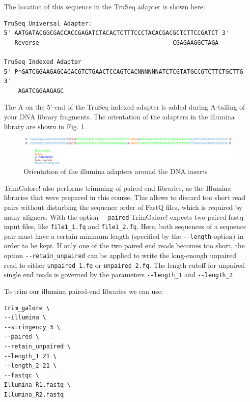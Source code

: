 \documentclass[11pt]{article}
\begin{document}
The location of this sequence in the TruSeq adapter is shown here:

\begin{verbatim}
TruSeq Universal Adapter:
5' AATGATACGGCGACCACCGAGATCTACACTCTTTCCCTACACGACGCTCTTCCGATCT 3'
   Reverse                                      CGAGAAGGCTAGA 

TruSeq Indexed Adapter
5' P*GATCGGAAGAGCACACGTCTGAACTCCAGTCACNNNNNNATCTCGTATGCCGTCTTCTGCTTG 3'
    AGATCGGAAGAGC
\end{verbatim}

The A on the 5'-end of the TruSeq indexed adapter is added during
A-tailing of your DNA library fragments.
The orientation of the adapters in the illumina library are shown in Fig. \ref{fig:illuminaadapters}.
\begin{figure}[htb]
\centering
\includegraphics[width=17cm]{IlluminaAdaptersVisualized.pdf}
\caption{\label{fig:illuminaadapters}Orientation of the illumina adapters around the DNA inserts}
\end{figure}


TrimGalore! also performs trimming of paired-end libraries, as the
Illumina libraries that were prepared in this course. This allows to
discard too short read pairs without disturbing the sequence order of
FastQ files, which is required by many aligners.  With the option
\texttt{-{}-paired} TrimGalore! expects two paired fastq input files, like
\texttt{file1\_1.fq} and \texttt{file1\_2.fq}.  Here, both sequences of a sequence
pair must have a certain minimum length (specified by the \texttt{-{}-length}
option) in order to be kept. If only one of the two paired end reads
becomes too short, the option \texttt{-{}-retain\_unpaired} can be applied to
write the long-enough unpaired read to either \texttt{unpaired\_1.fq} or
\texttt{unpaired\_2.fq}. The length cutoff for unpaired single end reads is
governed by the parameters \texttt{-{}-length\_1} and \texttt{-{}-length\_2}

To trim our illumina paired-end libraries we can use:

\begin{verbatim}
trim_galore \
--illumina \
--stringency 3 \
--paired \
--retain_unpaired \
--length_1 21 \
--length_2 21 \
--fastqc \
Illumina_R1.fastq \
Illumina_R2.fastq
\end{verbatim}
\end{document}
